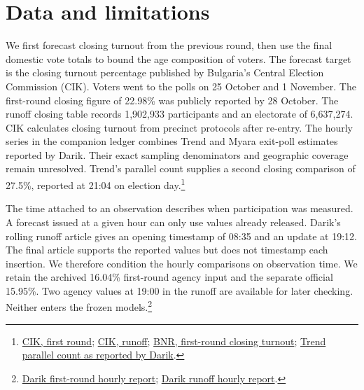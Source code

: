 \documentclass[11pt,a4paper]{article}
\begin{document}
\section{Data and limitations}
We first forecast closing turnout from the previous round, then use the final domestic vote totals to bound the age composition of voters. The forecast target is the closing turnout percentage published by Bulgaria's Central Election Commission (CIK). Voters went to the polls on 25 October and 1 November. The first-round closing figure of 22.98\% was publicly reported by 28 October. The runoff closing table records 1,902,933 participants and an electorate of 6,637,274. CIK calculates closing turnout from precinct protocols after re-entry. The hourly series in the companion ledger combines Trend and Myara exit-poll estimates reported by Darik. Their exact sampling denominators and geographic coverage remain unresolved. Trend's parallel count supplies a second closing comparison of 27.5\%, reported at 21:04 on election day.\footnote{\href{https://results.cik.bg/pvr202610/tur1/aktivnost/index.html}{CIK, first round}; \href{https://results.cik.bg/pvr202610/tur2/aktivnost/index.html}{CIK, runoff}; \href{https://www.bnrnews.bg/izbori/post/549194/aktivnostta-na-parviya-tur-na-prezidentskite-izbori-e-2298percent}{BNR, first-round closing turnout}; \href{https://darik.bg/kakvo-pokazvat-dannite-na-trend-pri-100-paralelnoto-prebroavane~550181.html}{Trend parallel count as reported by Darik}.}
\par The time attached to an observation describes when participation was measured. A forecast issued at a given hour can only use values already released. Darik's rolling runoff article gives an opening timestamp of 08:35 and an update at 19:12. The final article supports the reported values but does not timestamp each insertion. We therefore condition the hourly comparisons on observation time. We retain the archived 16.04\% first-round agency input and the separate official 15.95\%. Two agency values at 19:00 in the runoff are available for later checking. Neither enters the frozen models.\footnote{\href{https://dariknews.bg/novini/bylgariia/goliama-razlika-v-izbiratelnata-aktivnost-kakvo-pokazvat-dannite-kym-1900-chasa-2470058}{Darik first-round hourly report}; \href{https://dariknews.bg/novini/bylgariia/vizhte-izbiratelnata-aktivnost-na-balotazha-kym-1900-chasa-2470764}{Darik runoff hourly report}.}
\end{document}
